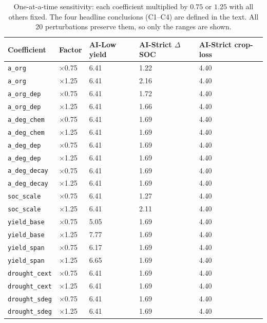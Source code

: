 \begin{table}[t]
  \centering
  \small
\caption{One-at-a-time sensitivity: each coefficient multiplied by $0.75$ or $1.25$ with all others fixed. The four headline conclusions (C1--C4) are defined in the text. All 20 perturbations preserve them, so only the ranges are shown.}
  \label{tab:sensitivity}
  \begin{tabular}{@{}lllll@{}}
    \toprule
    Coefficient & Factor & AI-Low yield & AI-Strict $\Delta$SOC & AI-Strict crop-loss \\
    \midrule
    \texttt{a\_org} & $\times$0.75 & 6.41 & 1.22 & 4.40 \\
    \texttt{a\_org} & $\times$1.25 & 6.41 & 2.16 & 4.40 \\
    \texttt{a\_org\_dep} & $\times$0.75 & 6.41 & 1.72 & 4.40 \\
    \texttt{a\_org\_dep} & $\times$1.25 & 6.41 & 1.66 & 4.40 \\
    \texttt{a\_deg\_chem} & $\times$0.75 & 6.41 & 1.69 & 4.40 \\
    \texttt{a\_deg\_chem} & $\times$1.25 & 6.41 & 1.69 & 4.40 \\
    \texttt{a\_deg\_dep} & $\times$0.75 & 6.41 & 1.69 & 4.40 \\
    \texttt{a\_deg\_dep} & $\times$1.25 & 6.41 & 1.69 & 4.40 \\
    \texttt{a\_deg\_decay} & $\times$0.75 & 6.41 & 1.69 & 4.40 \\
    \texttt{a\_deg\_decay} & $\times$1.25 & 6.41 & 1.69 & 4.40 \\
    \texttt{soc\_scale} & $\times$0.75 & 6.41 & 1.27 & 4.40 \\
    \texttt{soc\_scale} & $\times$1.25 & 6.41 & 2.11 & 4.40 \\
    \texttt{yield\_base} & $\times$0.75 & 5.05 & 1.69 & 4.40 \\
    \texttt{yield\_base} & $\times$1.25 & 7.77 & 1.69 & 4.40 \\
    \texttt{yield\_span} & $\times$0.75 & 6.17 & 1.69 & 4.40 \\
    \texttt{yield\_span} & $\times$1.25 & 6.65 & 1.69 & 4.40 \\
    \texttt{drought\_cext} & $\times$0.75 & 6.41 & 1.69 & 4.40 \\
    \texttt{drought\_cext} & $\times$1.25 & 6.41 & 1.69 & 4.40 \\
    \texttt{drought\_sdeg} & $\times$0.75 & 6.41 & 1.69 & 4.40 \\
    \texttt{drought\_sdeg} & $\times$1.25 & 6.41 & 1.69 & 4.40 \\
    \bottomrule
  \end{tabular}
\end{table}
